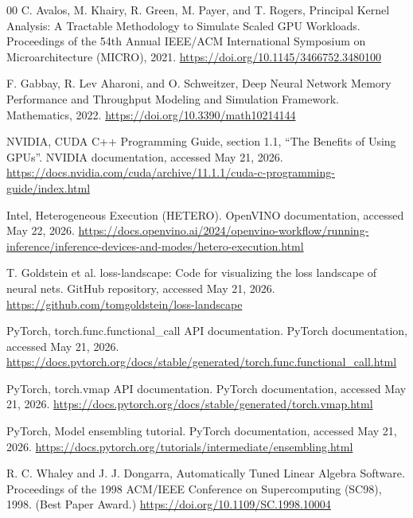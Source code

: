 \documentclass[conference]{IEEEtran}
\begin{document}
\begin{thebibliography}{00}
C. Avalos, M. Khairy, R. Green, M. Payer, and T. Rogers,
Principal Kernel Analysis: A Tractable Methodology to Simulate
Scaled GPU Workloads. Proceedings of the 54th Annual IEEE/ACM
International Symposium on Microarchitecture (MICRO), 2021.
\url{https://doi.org/10.1145/3466752.3480100}

F. Gabbay, R. Lev Aharoni, and O. Schweitzer, Deep Neural Network
Memory Performance and Throughput Modeling and Simulation Framework.
Mathematics, 2022. \url{https://doi.org/10.3390/math10214144}

NVIDIA, CUDA C++ Programming Guide, section 1.1, ``The Benefits
of Using GPUs''. NVIDIA documentation, accessed May 21, 2026.
\url{https://docs.nvidia.com/cuda/archive/11.1.1/cuda-c-programming-guide/index.html}

Intel, Heterogeneous Execution (HETERO). OpenVINO documentation,
accessed May 22, 2026.
\url{https://docs.openvino.ai/2024/openvino-workflow/running-inference/inference-devices-and-modes/hetero-execution.html}

T. Goldstein et al. loss-landscape: Code for visualizing the loss
landscape of neural nets. GitHub repository, accessed May 21, 2026.
\url{https://github.com/tomgoldstein/loss-landscape}

PyTorch, torch.func.functional\_call API documentation. PyTorch
documentation, accessed May 21, 2026.
\url{https://docs.pytorch.org/docs/stable/generated/torch.func.functional_call.html}

PyTorch, torch.vmap API documentation. PyTorch documentation,
accessed May 21, 2026.
\url{https://docs.pytorch.org/docs/stable/generated/torch.vmap.html}

PyTorch, Model ensembling tutorial. PyTorch documentation,
accessed May 21, 2026.
\url{https://docs.pytorch.org/tutorials/intermediate/ensembling.html}

R. C. Whaley and J. J. Dongarra, Automatically Tuned Linear
Algebra Software. Proceedings of the 1998 ACM/IEEE Conference
on Supercomputing (SC98), 1998. (Best Paper Award.)
\url{https://doi.org/10.1109/SC.1998.10004}

\end{thebibliography}


\end{document}
